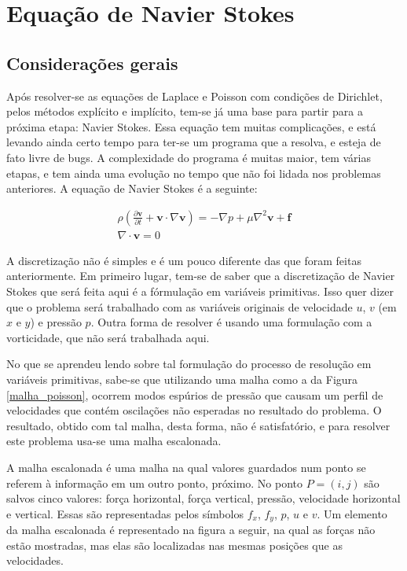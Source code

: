 \documentclass[journal]{IEEEtran}
\begin{document}
\section{Equação de Navier Stokes}
\subsection*{Considerações gerais}
Após resolver-se as equações de Laplace e Poisson com condições de Dirichlet, pelos métodos explícito e implícito, tem-se já uma base para partir para a próxima etapa: Navier Stokes. Essa equação tem muitas complicações, e está levando ainda certo tempo para ter-se um programa que a resolva, e esteja de fato livre de bugs. A complexidade do programa é muitas maior, tem várias etapas, e tem ainda uma evolução no tempo que não foi lidada nos problemas anteriores. A equação de Navier Stokes é a seguinte:

\begin{eqnarray}
\rho\left( \frac{\partial \textbf{v}}{\partial
t}+\textbf{v}\cdot\nabla\textbf{v}\right)=-\nabla
p+\mu\nabla^2\textbf{v}+\textbf{f} \label{ns}\\
 \nabla\cdot \textbf{v}=0 \label{divergente_zero}
\end{eqnarray}

A discretização não é simples e é um pouco diferente das que foram feitas anteriormente. Em primeiro lugar, tem-se de saber que a discretização de Navier Stokes que será feita aqui é a fórmulação em variáveis primitivas. Isso quer dizer que o problema será trabalhado com as variáveis originais de velocidade $u$, $v$ (em $x$ e $y$) e pressão $p$. Outra forma de resolver é usando uma formulação com a vorticidade, que não será trabalhada aqui.

No que se aprendeu lendo sobre tal formulação do processo de resolução em variáveis primitivas, sabe-se que utilizando uma malha como a da Figura \ref{malha_poisson}, ocorrem modos espúrios de pressão que causam um perfil de velocidades que contém oscilações não esperadas no resultado do problema. O resultado, obtido com tal malha, desta forma, não é satisfatório, e para resolver este problema usa-se uma malha escalonada.

A malha escalonada é uma malha na qual valores guardados num ponto se referem à informação em um outro ponto, próximo. No ponto $P=(i,j)$ são salvos cinco valores: força horizontal, força vertical, pressão, velocidade horizontal e vertical. Essas são representadas pelos símbolos $f_x$, $f_y$, $p$, $u$ e $v$. Um elemento da malha escalonada é representado na figura a seguir, na qual as forças não estão mostradas, mas elas são localizadas nas mesmas posições que as velocidades.
\end{document}

